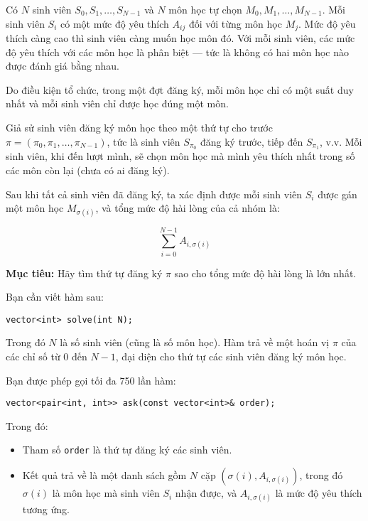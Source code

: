Có $N$ sinh viên $S_0, S_1, \ldots, S_{N - 1}$ và $N$ môn học tự chọn $M_0, M_1, \ldots, M_{N - 1}$. Mỗi sinh viên $S_i$ có một mức độ yêu thích $A_{ij}$ đối với từng môn học $M_j$. Mức độ yêu thích càng cao thì sinh viên càng muốn học môn đó. Với mỗi sinh viên, các mức độ yêu thích với các môn học là phân biệt --- tức là không có hai môn học nào được đánh giá bằng nhau.

Do điều kiện tổ chức, trong một đợt đăng ký, mỗi môn học chỉ có một suất duy nhất và mỗi sinh viên chỉ được học đúng một môn.

Giả sử sinh viên đăng ký môn học theo một thứ tự cho trước $\pi = (\pi_0, \pi_1, \dots, \pi_{N-1})$, tức là sinh viên $S_{\pi_0}$ đăng ký trước, tiếp đến $S_{\pi_1}$, v.v. Mỗi sinh viên, khi đến lượt mình, sẽ chọn môn học mà mình yêu thích nhất trong số các môn còn lại (chưa có ai đăng ký).

Sau khi tất cả sinh viên đã đăng ký, ta xác định được mỗi sinh viên $S_i$ được gán một môn học $M_{\sigma(i)}$, và tổng mức độ hài lòng của cả nhóm là:

\begin{center}
$$
\sum_{i = 0}^{N - 1} A_{i, \sigma(i)}
$$
\end{center}

\textbf{Mục tiêu:} Hãy tìm thứ tự đăng ký $\pi$ sao cho tổng mức độ hài lòng là lớn nhất.

\Interaction
Bạn cần viết hàm sau:
\begin{center}
\begin{lstlisting}
vector<int> solve(int N);
\end{lstlisting}
\end{center}

Trong đó $N$ là số sinh viên (cũng là số môn học). Hàm trả về một hoán vị $\pi$ của các chỉ số từ $0$ đến $N - 1$, đại diện cho thứ tự các sinh viên đăng ký môn học.

Bạn được phép gọi tối đa 750 lần hàm:
\begin{center}
\begin{lstlisting}
vector<pair<int, int>> ask(const vector<int>& order);
\end{lstlisting}
\end{center}
Trong đó:
\begin{itemize}
    \item Tham số \texttt{order} là thứ tự đăng ký các sinh viên.
    \item Kết quả trả về là một danh sách gồm $N$ cặp $(\sigma(i), A_{i, \sigma(i)})$, trong đó $\sigma(i)$ là môn học mà sinh viên $S_i$ nhận được, và $A_{i, \sigma(i)}$ là mức độ yêu thích tương ứng.
\end{itemize}